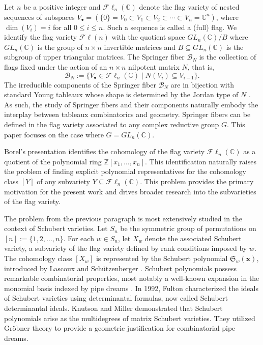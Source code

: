 \documentclass[11pt]{amsart}
\theoremstyle{remark}
\theoremstyle{remark}
\theoremstyle{definition}
\theoremstyle{definition}
\theoremstyle{definition}
\numberwithin{equation}{section}
\newcommand{\C}{\mathbb{C}}           %
\newcommand{\Z}{\mathbb{ Z}}           %
\newcommand{\SF}{\mathcal{B}}
\newcommand{\Fl}{\mathcal{F}\ell}
\begin{document}
 
Let $n$ be a positive integer and $\Fl_n(\C)$ denote the flag variety of nested sequences of subspaces $V_\bullet = (\{0\}=V_0\subset V_1\subset V_2\subset \cdots \subset V_n=\mathbb{C}^n)$, where $\dim(V_i)=i$ for all $0\leq i\leq n$. Such a sequence is called a (full) flag. We identify the flag variety $\mathcal{F}\ell(n)$ with the quotient space $GL_n(\C)/B$ where $GL_n(\C)$ is the group of $n\times n$ invertible matrices and $B\subseteq GL_n(\C)$ is the subgroup of upper triangular matrices.   The Springer fiber $\SF_N$ is the collection of flags fixed under the action of an $n\times n$ nilpotent matrix $N$, that is, 
\[
\SF_N := \{V_\bullet \in \Fl_n(\C) \mid N(V_i)\subseteq V_{i-1}\}.
\]
The irreducible components of the Springer fiber $\mathcal{B}_N$ are in bijection with standard Young tableaux whose shape is determined by the Jordan type of $N$ \cite{Spaltenstein1976,Vargas79}. As such, the study of Springer fibers and their components naturally embody the interplay between tableaux combinatorics and geometry. Springer fibers can be defined in the flag variety associated to any complex reductive group $G$. This paper focuses on the case where $G=GL_n(\C)$. 





Borel's presentation identifies the cohomology of the flag variety $\Fl_n(\C)$ as a quotient of the polynomial ring $\Z[x_1, \ldots, x_n]$. This identification naturally raises the problem of finding explicit polynomial representatives for the cohomology class $[Y]$ of any subvariety $Y \subseteq \Fl_n(\C)$. This problem provides the primary motivation for the present work and drives broader research into the subvarieties of the flag variety.

The problem from the previous paragraph is most extensively studied in the context of Schubert varieties. Let $S_n$ be the symmetric group of permutations on $[n]:=\{1,2,\ldots, n\}$. For each $w\in S_n$, let $X_w$ denote the associated Schubert variety, a subvariety of the flag variety defined by rank conditions imposed by $w$. The cohomology class $[X_w]$ is represented by the Schubert polynomial $\mathfrak{S}_w(\mathbf{x})$, introduced by Lascoux and Schützenberger \cite{LascouxSchutzenberger1982}. Schubert polynomials possess remarkable combinatorial properties, most notably a well-known expansion in the monomial basis indexed by pipe dreams \cite{BergeronBilley1993}. In 1992, Fulton \cite{Fulton1992} characterized the ideals of Schubert varieties using determinantal formulas, now called Schubert determinantal ideals. Knutson and Miller \cite{KnutsonMiller2005} demonstrated that Schubert polynomials arise as the multidegrees of matrix Schubert varieties. They utilized Gr\"{o}bner theory to provide a geometric justification for combinatorial pipe dreams.
\end{document}
